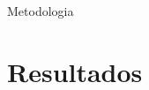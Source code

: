 \documentclass{beamer}
\begin{document}
\begin{frame}{Metodologia}
\centering


\end{frame}

\section{Resultados}
\end{document}

